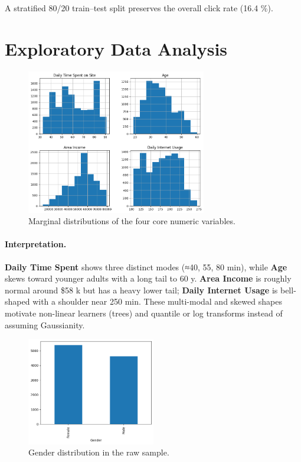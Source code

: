 \documentclass[12pt,a4paper]{article}
\begin{document}
A stratified 80/20 train–test split preserves the overall click rate
(16.4 \%).

\section{Exploratory Data Analysis}\label{sec:eda}

\begin{figure}[H]
  \centering
  \includegraphics[width=0.7\textwidth]{output.png}
  \caption{Marginal distributions of the four core numeric variables.}
  \label{fig:univariate}
\end{figure}

\paragraph{Interpretation.}
\textbf{Daily Time Spent} shows three distinct modes (≈40, 55, 80 min), while
\textbf{Age} skews toward younger adults with a long tail to 60 y.
\textbf{Area Income} is roughly normal around \$58 k but has a heavy lower tail;
\textbf{Daily Internet Usage} is bell-shaped with a shoulder near 250 min.
These multi-modal and skewed shapes motivate non-linear learners (trees) and
quantile or log transforms instead of assuming Gaussianity.

\begin{figure}[H]
  \centering
  \includegraphics[width=0.5\textwidth]{output2.png}
  \caption{Gender distribution in the raw sample.}
  \label{fig:gender}
\end{figure}
\end{document}
